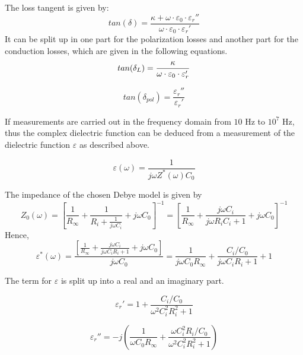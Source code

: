 The loss tangent is given by:
\begin{equation}
tan (\delta) = \frac{\kappa + \omega \cdot \varepsilon_0 \cdot \varepsilon _r ''}{\omega \cdot \varepsilon_0 \cdot \varepsilon _r '}
\end{equation}
It can be split up in one part for the polarization losses and another part for the conduction losses, which are given in the following equations. 
\begin{equation}
tan (\delta_{L}) = \frac{\kappa}{\omega \cdot \varepsilon_0 \cdot \varepsilon_r'} \newline
\end{equation}

\begin{equation}
tan (\delta_{pol}) = \frac {\varepsilon_r'' } {\varepsilon_r'}
\end{equation}


If measurements are carried out in the frequency domain from $10$ Hz to $10^{7}$ Hz, thus the complex dielectric function can be deduced from a measurement of the  dielectric function $\varepsilon$ as described above. 

\begin{equation}
\varepsilon(\omega) = \frac{1}{j \omega  Z^*(\omega) C_0}
\end{equation}

The impedance of the chosen Debye model is given by 
\begin{equation}
Z_0(\omega)=[\frac{1}{R_\infty}+\frac{1}{R_i+\frac{1}{j \omega C_i}}+j \omega C_0]^{-1} = [\frac{1}{R_\infty}+\frac{j \omega C_i}{j\omega R_i  C_i+1}+j \omega C_0]^{-1}
\end{equation}
Hence,
\begin{equation}
\varepsilon^*(\omega)= \frac{[\frac{1}{R_\infty}+\frac{j \omega C_i}{j\omega C_i R_i  +1}+j \omega C_0]}{j \omega C_0} = \frac{1}{j \omega C_0 R_\infty}+ \frac{C_i/C_0}{j\omega C_i R_i  +1}+1
\end{equation}

The term for $\varepsilon$ is split up into a real and an imaginary part. 

\begin{equation}
\varepsilon_r' = 1+ \frac{C_i/C_0}{\omega^2 C_i^2 R_i^2 +1}
\end{equation}

\begin{equation}
\varepsilon_r'' = -j \left(\frac{1}{\omega C_0 R_\infty}+\frac{\omega C_i^2 R_i / C_0}{\omega^2 C_i^2 R_i^2 +1} \right)
\end{equation}

